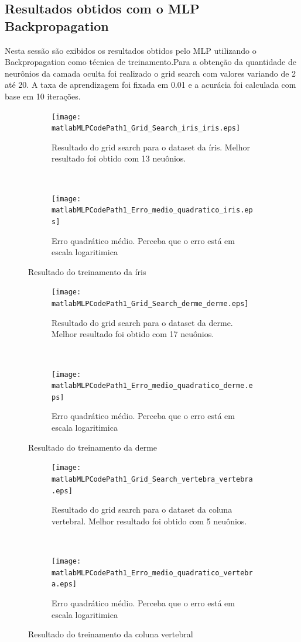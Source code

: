 \documentclass[
	article,			%
	11pt,				%
	oneside,			%
	a4paper,			%
	english,			%
	brazil,				%
	sumario=tradicional
	]{abntex2}
\newcommand{\matlabMLPCodePath}{/home/clifte/git/Mestrado/Matlab/Trabalho_RNA/trabalho2/MLP/}
\begin{document}
\subsection{Resultados obtidos com o MLP Backpropagation}
Nesta sessão são exibidos os resultados obtidos pelo MLP utilizando o
Backpropagation como técnica de treinamento.Para a obtenção da quantidade de
neurônios da camada oculta foi realizado o grid search com valores variando de 2
até 20. A taxa de aprendizagem foi fixada em 0.01 e a acurácia foi calculada com
base em 10 iterações.

\begin{figure} 
	\centering
	\begin{subfigure}[b]{0.4\textwidth}
		\texttt{[image: \\matlabMLPCodePath1\_Grid\_Search\_iris\_iris.eps]}
		\caption{Resultado do grid search para o dataset da íris. Melhor resultado foi
		obtido com 13 neuônios.}
	\end{subfigure}
    ~
    \begin{subfigure}[b]{0.4\textwidth}
		\texttt{[image: \\matlabMLPCodePath1\_Erro\_medio\_quadratico\_iris.eps]}
		\caption{Erro quadrático médio. Perceba que o erro está em escala
		logaritimica}
	\end{subfigure}     
  \caption{Resultado do treinamento da íris}
\end{figure}


\begin{figure} 
	\centering
	\begin{subfigure}[b]{0.4\textwidth}
		\texttt{[image: \\matlabMLPCodePath1\_Grid\_Search\_derme\_derme.eps]}
		\caption{Resultado do grid search para o dataset da derme. Melhor resultado
		foi obtido com 17 neuônios.}
	\end{subfigure}
    ~
    \begin{subfigure}[b]{0.4\textwidth}
		\texttt{[image: \\matlabMLPCodePath1\_Erro\_medio\_quadratico\_derme.eps]}
		\caption{Erro quadrático médio. Perceba que o erro está em escala
		logaritimica}
	\end{subfigure}     
  \caption{Resultado do treinamento da derme}
\end{figure}


\begin{figure} 
	\centering
	\begin{subfigure}[b]{0.4\textwidth}
		\texttt{[image: \\matlabMLPCodePath1\_Grid\_Search\_vertebra\_vertebra.eps]}
		\caption{Resultado do grid search para o dataset da coluna vertebral. Melhor
		resultado foi obtido com 5 neuônios.}
	\end{subfigure}
    ~
    \begin{subfigure}[b]{0.4\textwidth}
		\texttt{[image: \\matlabMLPCodePath1\_Erro\_medio\_quadratico\_vertebra.eps]}
		\caption{Erro quadrático médio. Perceba que o erro está em escala
		logaritimica}
	\end{subfigure}     
  \caption{Resultado do treinamento da coluna vertebral}
\end{figure}
\end{document}
